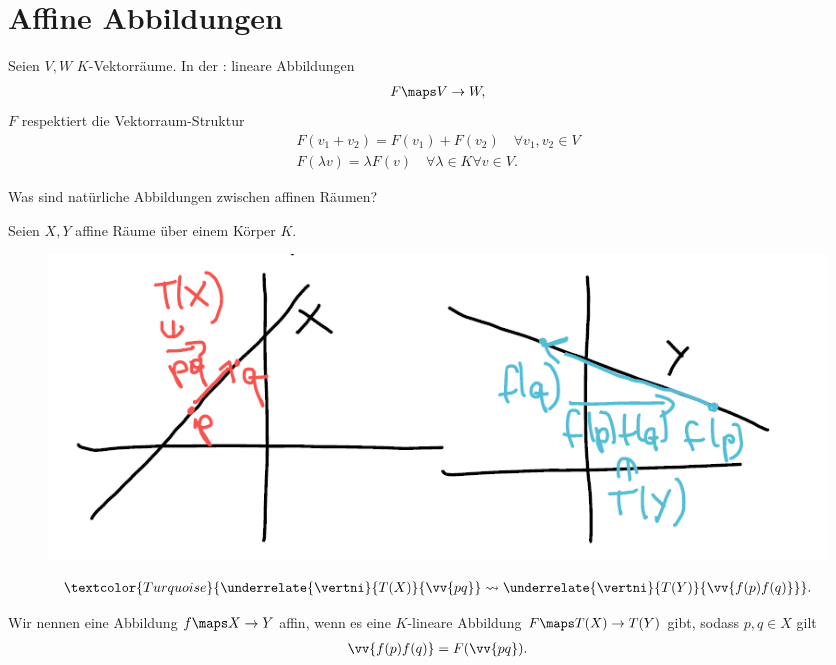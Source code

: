 \section{Affine Abbildungen}
Seien \( V,W \) \( K \)-Vektorräume.
In der : lineare Abbildungen
\begin{align*}
    F\maps V\to W,
\end{align*}
\dh \( F \) respektiert die Vektorraum-Struktur
\begin{align*}
    F(v_1+v_2)=F(v_1)+F(v_2)\quad\forall v_1,v_2\in V\\
    F(\lambda v)=\lambda F(v)\quad \forall\lambda\in K \forall v \in V.
\end{align*}
\begin{frage*}
    Was sind natürliche Abbildungen zwischen affinen Räumen?
\end{frage*}
Seien \( X, Y \) affine Räume über einem Körper \( K \).
\begin{figure}[H]
    \centering
    \includegraphics[width=0.8\linewidth]{figures/affine_Abbildungen}
    \label{fig:affine_Abbildungen}
\end{figure}
\begin{align*}
    \textcolor{Turquoise}{\underrelate{\vertni}{T(X)}{\vv{pq}}\rightsquigarrow\underrelate{\vertni}{T(Y)}{\vv{f(p)f(q)}}}.
\end{align*}
\begin{definition*}
    Wir nennen eine Abbildung \( f\maps X \to Y \) affin, wenn es eine \( K \)-lineare Abbildung \( F\maps T(X)\to T(Y) \) gibt, sodass \tforall \( p,q\in X \) gilt
    \begin{align*}
        \vv{f(p)f(q)}=F(\vv{pq}).
    \end{align*}
\end{definition*}

